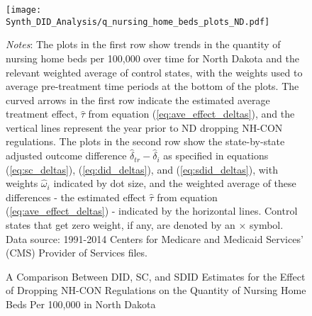 \documentclass[../Main.tex]{subfiles}
\begin{document}
\newpage
\begin{figure}[t] 
	\begin{center}
	\caption{\label{fig:q_nhb_plots_nd} \centering A Comparison Between DID, SC, and SDID Estimates for the Effect of Dropping NH-CON Regulations on the Quantity of Nursing Home Beds Per 100,000 in North Dakota}
    \texttt{[image: Synth\_DID\_Analysis/q\_nursing\_home\_beds\_plots\_ND.pdf]}
    \end{center}
    \footnotesize
		\textit{Notes}: The plots in the first row show trends in the quantity of nursing home beds per 100,000 over time for North Dakota and the relevant weighted average of control states, with the weights used to average pre-treatment time periods at the bottom of the plots. The curved arrows in the first row indicate the estimated average treatment effect, $\hat{\tau}$ from equation (\ref{eq:ave_effect_deltas}), and the vertical lines represent the year prior to ND dropping NH-CON regulations. The plots in the second row show the state-by-state adjusted outcome difference $\hat{\delta}_{tr}-\hat{\delta}_i$ as specified in equations (\ref{eq:sc_deltas}), (\ref{eq:did_deltas}), and (\ref{eq:sdid_deltas}), with weights $\hat{\omega}_i$ indicated by dot size, and the weighted average of these differences - the estimated effect $\hat{\tau}$ from equation (\ref{eq:ave_effect_deltas}) - indicated by the horizontal lines. Control states that get zero weight, if any, are denoted by an $\times$ symbol. Data source: 1991-2014 Centers for Medicare and Medicaid Services’ (CMS) Provider of Services files.
\end{figure}
\clearpage
\end{document}
